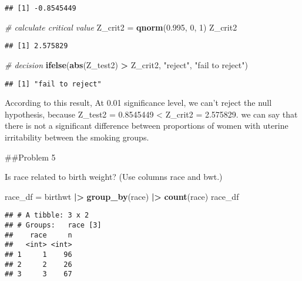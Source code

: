 \documentclass[
]{article}
\newenvironment{Shaded}{\begin{snugshade}}{\end{snugshade}}
\newcommand{\CommentTok}[1]{\textcolor[rgb]{0.56,0.35,0.01}{\textit{#1}}}
\newcommand{\DecValTok}[1]{\textcolor[rgb]{0.00,0.00,0.81}{#1}}
\newcommand{\FloatTok}[1]{\textcolor[rgb]{0.00,0.00,0.81}{#1}}
\newcommand{\FunctionTok}[1]{\textcolor[rgb]{0.13,0.29,0.53}{\textbf{#1}}}
\newcommand{\NormalTok}[1]{#1}
\newcommand{\OtherTok}[1]{\textcolor[rgb]{0.56,0.35,0.01}{#1}}
\newcommand{\SpecialCharTok}[1]{\textcolor[rgb]{0.81,0.36,0.00}{\textbf{#1}}}
\newcommand{\StringTok}[1]{\textcolor[rgb]{0.31,0.60,0.02}{#1}}
\begin{document}
\begin{verbatim}
## [1] -0.8545449
\end{verbatim}

\begin{Shaded}
\begin{Highlighting}[]
\CommentTok{\# calculate critical value }
\NormalTok{Z\_crit2 }\OtherTok{=} \FunctionTok{qnorm}\NormalTok{(}\FloatTok{0.995}\NormalTok{, }\DecValTok{0}\NormalTok{, }\DecValTok{1}\NormalTok{)}
\NormalTok{Z\_crit2}
\end{Highlighting}
\end{Shaded}

\begin{verbatim}
## [1] 2.575829
\end{verbatim}

\begin{Shaded}
\begin{Highlighting}[]
\CommentTok{\# decision}
\FunctionTok{ifelse}\NormalTok{(}\FunctionTok{abs}\NormalTok{(Z\_test2) }\SpecialCharTok{\textgreater{}}\NormalTok{ Z\_crit2, }\StringTok{"reject"}\NormalTok{, }\StringTok{"fail to reject"}\NormalTok{)}
\end{Highlighting}
\end{Shaded}

\begin{verbatim}
## [1] "fail to reject"
\end{verbatim}

According to this result, At 0.01 significance level, we can't reject
the null hypothesis, because \textbar Z\_test2\textbar{} = 0.8545449
\textless{} Z\_crit2 = 2.575829. we can say that there is not a
significant difference between proportions of women with uterine
irritability between the smoking groups.

\#\#Problem 5

Is race related to birth weight? (Use columns race and bwt.)

\begin{Shaded}
\begin{Highlighting}[]
\NormalTok{race\_df }\OtherTok{=}
\NormalTok{  birthwt }\SpecialCharTok{|\textgreater{}} 
  \FunctionTok{group\_by}\NormalTok{(race) }\SpecialCharTok{|\textgreater{}} 
  \FunctionTok{count}\NormalTok{(race)}
\NormalTok{race\_df}
\end{Highlighting}
\end{Shaded}

\begin{verbatim}
## # A tibble: 3 x 2
## # Groups:   race [3]
##    race     n
##   <int> <int>
## 1     1    96
## 2     2    26
## 3     3    67
\end{verbatim}
\end{document}
